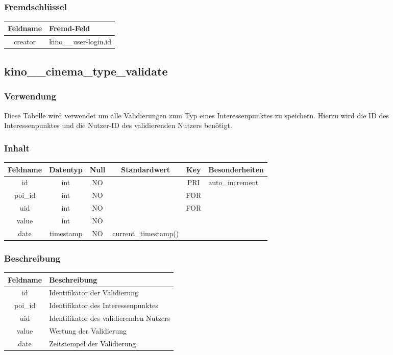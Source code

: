 \subsubsection{Fremdschlüssel}
\begin{table}[H]
	\begin{tabular}{|c|p{12.5cm}|}
		\hline
		\textbf{Feldname} & \textbf{Fremd-Feld} \\ \hline
		creator & kino\_\_user-login.id \\ \hline
	\end{tabular}
\end{table}
\subsection{kino\_\_cinema\_type\_validate}
\subsubsection{Verwendung} Diese Tabelle wird verwendet um alle Validierungen zum Typ eines Interessenpunktes zu speichern. Hierzu wird die ID des Interessenpunktes und die Nutzer-ID des validierenden Nutzers benötigt.
\subsubsection{Inhalt}
\begin{table}[H]
	\begin{tabular}{|c|c|c|c|c|p{3.5cm}|}
		\hline
		\textbf{Feldname} & \textbf{Datentyp} & \textbf{Null} & \textbf{Standardwert} & \textbf{Key}   & \textbf{Besonderheiten} \\ \hline
		id & int & NO &  & PRI & auto\_increment \\ \hline
		poi\_id & int & NO &  & FOR &  \\ \hline
		uid & int & NO &  & FOR &  \\ \hline
		value & int & NO &  &  &  \\ \hline
		date & timestamp & NO & current\_timestamp() &  &  \\ \hline
	\end{tabular}
\end{table}
\subsubsection{Beschreibung}
\begin{table}[H]
	\begin{tabular}{|c|p{12cm}|}
		\hline
		\textbf{Feldname} & \textbf{Beschreibung} \\ \hline
		id & Identifikator der Validierung \\ \hline
		poi\_id & Identifikator des Interessenpunktes \\ \hline
		uid & Identifikator des validierenden Nutzers \\ \hline
		value & Wertung der Validierung \\ \hline
		date & Zeitstempel der Validierung \\ \hline
	\end{tabular}
\end{table}
